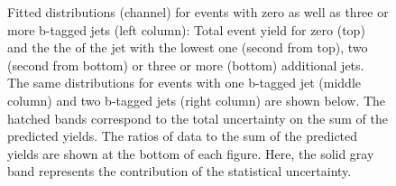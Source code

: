 \begin{figure}[htbp!]
\begin{center}
\caption{Fitted distributions (\emu channel) for events with zero as well as three or
  more b-tagged jets (left column): Total event yield for zero (top) and the the \pt of the jet with the lowest \pt one (second from top),
  two (second from bottom) or three or more (bottom) additional jets. The same distributions for events with one
  b-tagged jet (middle column) and two b-tagged jets (right column) are
  shown below.   
  The hatched bands correspond to the total uncertainty on the sum of
  the predicted yields. The ratios of data to the sum of the
  predicted yields are shown at the bottom of each figure. Here, the solid
  gray band represents the contribution of the statistical uncertainty.   
       \label{fig:lh_emu_postfitdistr8}}
  \end{center}
\end{figure}

